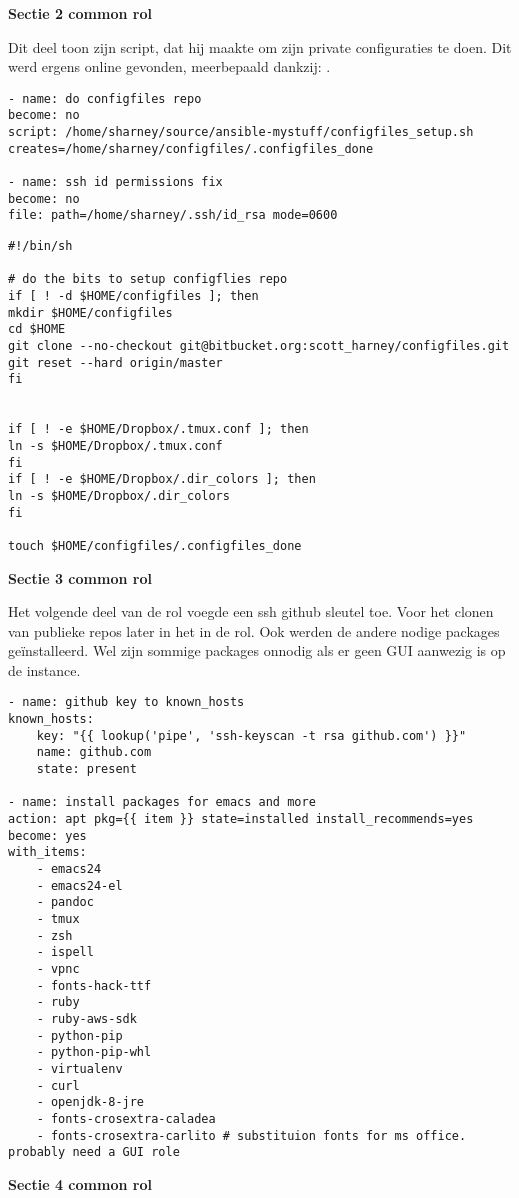\textbf{Sectie 2 common rol}

Dit deel toon \autocite{commonscottharney} zijn script, dat hij maakte om zijn private configuraties te doen. Dit werd ergens online gevonden, meerbepaald dankzij: \autocite{justinellin}.
\begin{lstlisting}
- name: do configfiles repo
become: no
script: /home/sharney/source/ansible-mystuff/configfiles_setup.sh  creates=/home/sharney/configfiles/.configfiles_done

- name: ssh id permissions fix 
become: no
file: path=/home/sharney/.ssh/id_rsa mode=0600
\end{lstlisting}

\begin{lstlisting}
#!/bin/sh

# do the bits to setup configflies repo
if [ ! -d $HOME/configfiles ]; then
mkdir $HOME/configfiles 
cd $HOME
git clone --no-checkout git@bitbucket.org:scott_harney/configfiles.git
git reset --hard origin/master
fi


if [ ! -e $HOME/Dropbox/.tmux.conf ]; then 
ln -s $HOME/Dropbox/.tmux.conf
fi
if [ ! -e $HOME/Dropbox/.dir_colors ]; then
ln -s $HOME/Dropbox/.dir_colors
fi

touch $HOME/configfiles/.configfiles_done
\end{lstlisting}

\textbf{Sectie 3 common rol}

Het volgende deel van de rol voegde een ssh github sleutel toe. Voor het clonen van publieke repos later in het in de rol. Ook werden de andere nodige packages geïnstalleerd. Wel zijn sommige packages onnodig als er geen GUI aanwezig is op de instance.
\begin{lstlisting}
- name: github key to known_hosts
known_hosts:
    key: "{{ lookup('pipe', 'ssh-keyscan -t rsa github.com') }}"
    name: github.com
    state: present

- name: install packages for emacs and more
action: apt pkg={{ item }} state=installed install_recommends=yes
become: yes
with_items:
    - emacs24
    - emacs24-el
    - pandoc
    - tmux
    - zsh
    - ispell
    - vpnc
    - fonts-hack-ttf
    - ruby
    - ruby-aws-sdk
    - python-pip
    - python-pip-whl
    - virtualenv
    - curl
    - openjdk-8-jre
    - fonts-crosextra-caladea
    - fonts-crosextra-carlito # substituion fonts for ms office. probably need a GUI role
\end{lstlisting}

\textbf{Sectie 4 common rol}


